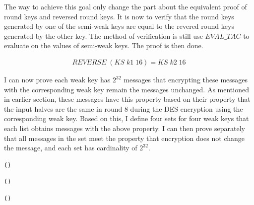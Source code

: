 \documentclass{article}
\begin{document}
The way to achieve this goal only change the part about the equivalent proof of round keys and reversed round keys.
It is now to verify that the round keys generated by one of the semi-weak keys are equal to the revered round
keys generated by the other key. The method of verification is still use $EVAL\_TAC$ to evaluate on the values of semi-weak
keys. The proof is then done.

\begin{multline}
 REVERSE \; (KS \; k1 \; 16)= KS \; k2 \; 16
\end{multline}

I can now prove each weak key has $2^{32}$ messages that encrypting these messages with the corresponding weak key remain
the messages unchanged. As mentioned in earlier section, these messages have this property based on their property that
the input halves are the same in round 8 during the DES encryption using the corresponding weak key. Based on this, I define
four sets for four weak keys that each list obtains messages with the above property. I can then prove separately that
all messages in the set meet the property that encryption does not change the message, and each set has cardinality
of $2^{32}$.

\begin{alltt}
   \HOLTokenTurnstile{}  \HOLSymConst{\HOLTokenIn{}}  \HOLSymConst{\HOLTokenConj{}}   \HOLSymConst{=} (\HOLSymConst{,}) \HOLSymConst{\HOLTokenImp{}}
     \HOLSymConst{=} 
\end{alltt}

\begin{alltt}
   \HOLTokenTurnstile{}  \HOLSymConst{\HOLTokenIn{}}  \HOLSymConst{\HOLTokenConj{}}   \HOLSymConst{=} (\HOLSymConst{,}) \HOLSymConst{\HOLTokenImp{}}
     \HOLSymConst{=} 
\end{alltt}

\begin{alltt}
   \HOLTokenTurnstile{}  \HOLSymConst{\HOLTokenIn{}}  \HOLSymConst{\HOLTokenConj{}}   \HOLSymConst{=} (\HOLSymConst{,}) \HOLSymConst{\HOLTokenImp{}}
     \HOLSymConst{=} 
\end{alltt}
\end{document}
